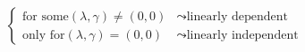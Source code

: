 \documentclass[preview]{standalone}
\begin{document}
\begin{align*}
\begin{cases} \text{for some} (\lambda , \gamma) \neq (0,0) & \leadsto \text{linearly dependent} \\\text{only for} (\lambda , \gamma) = (0,0) & \leadsto \text{linearly independent}\end{cases}
\end{align*}
\end{document}
